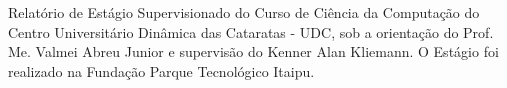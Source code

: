 \begin{center}
	\vspace{180pt}
\end{center}

\vspace{20pt}

\begin{flushright}
\begin{minipage}[c]{0.66\columnwidth}
Relatório de Estágio Supervisionado do
Curso de Ciência da Computação do
Centro Universitário Dinâmica das Cataratas - UDC, sob a orientação do Prof. Me. Valmei Abreu Junior e supervisão do Kenner Alan Kliemann. O Estágio foi realizado na Fundação Parque Tecnológico Itaipu.

\vspace{1cm}

\end{minipage}
\end{flushright}
\begin{center}
\par\vfill
\end{center}
\thispagestyle{empty} 